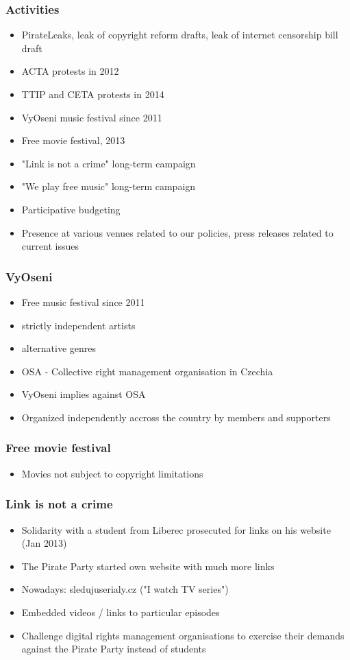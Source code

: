 \begin{frame}
	\frametitle{Activities}
	\begin{itemize}
		\item PirateLeaks, leak of copyright reform drafts, leak of internet censorship bill draft
		\item ACTA protests in 2012
		\item TTIP and CETA protests in 2014
		\item VyOseni music festival since 2011
		\item Free movie festival, 2013
		\item "Link is not a crime" long-term campaign
		\item "We play free music" long-term campaign
		\item Participative budgeting
		\item Presence at various venues related to our policies, press releases related to current issues

	\end{itemize}
\end{frame}

\begin{frame}
	\frametitle{VyOseni}
	\begin{itemize}
		\item Free music festival since 2011
		\item strictly independent artists
		\item alternative genres
		\item OSA - Collective right management organisation in Czechia
		\item VyOseni implies against OSA
		\item Organized independently accross the country by members and supporters
	\end{itemize}
\end{frame}

\begin{frame}
	\frametitle{Free movie festival}
	\begin{itemize}
		\item Movies not subject to copyright limitations
	\end{itemize}
\end{frame}

\begin{frame}
	\frametitle{Link is not a crime}
	\begin{itemize}
		\item Solidarity with a student from Liberec prosecuted for links on his website (Jan 2013)
		\item The Pirate Party started own website with much more links
		\item Nowadays: sledujuserialy.cz ("I watch TV series")
		\item Embedded videos / links to particular episodes
		\item Challenge digital rights management organisations to exercise their demands against the Pirate Party instead of students
	\end{itemize}
\end{frame}

